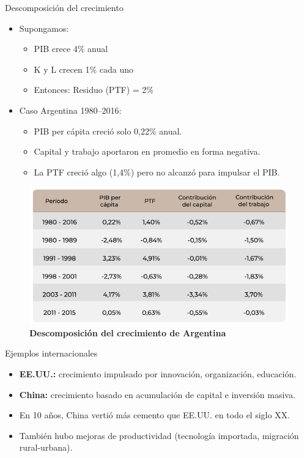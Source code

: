 \documentclass{beamer}
\begin{document}
\begin{frame}{Descomposición del crecimiento}
    \scriptsize
    \begin{itemize}
        \scriptsize
        \item Supongamos:
        \begin{itemize}
            \scriptsize
            \item PIB crece 4\% anual
            \item K y L crecen 1\% cada uno
            \item Entonces: Residuo (PTF) = 2\%
        \end{itemize}
        \item Caso Argentina 1980--2016:
        \begin{itemize}
            \scriptsize
            \item PIB per cápita creció solo 0{,}22\% anual.
            \item Capital y trabajo aportaron en promedio en forma negativa.
            \item La PTF creció algo (1{,}4\%) pero no alcanzó para impulsar el PIB.
        \end{itemize}
    \end{itemize}
    \begin{figure} [H]   
        \includegraphics[scale=0.45]{../Figures/C30.8.png}
        \caption{\tiny \textbf{Descomposición del crecimiento de Argentina}}
    \end{figure}
\end{frame}

\begin{frame}{Ejemplos internacionales}
    \begin{itemize}
        \item \textbf{EE.UU.:} crecimiento impulsado por innovación, organización, educación.
        \item \textbf{China:} crecimiento basado en acumulación de capital e inversión masiva.
        \item En 10 años, China vertió más cemento que EE.UU. en todo el siglo XX.
        \item También hubo mejoras de productividad (tecnología importada, migración rural-urbana).
    \end{itemize}
\end{frame}
\end{document}
